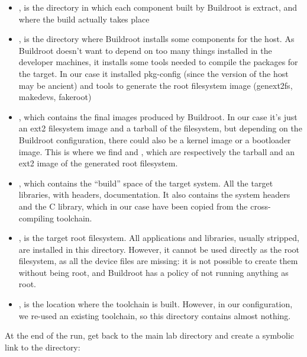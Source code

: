 \begin{itemize}

\item {}, is the directory in which each component built by
  Buildroot is extract, and where the build actually takes place

\item {}, is the directory where Buildroot installs some
  components for the host. As Buildroot doesn't want to depend on too
  many things installed in the developer machines, it installs some
  tools needed to compile the packages for the target. In our case it
  installed pkg-config (since the version of the host may be ancient)
  and tools to generate the root filesystem image (genext2fs,
  makedevs, fakeroot)

\item {}, which contains the final images produced by
  Buildroot. In our case it's just an ext2 filesystem image and a
  tarball of the filesystem, but depending on the Buildroot
  configuration, there could also be a kernel image or a bootloader
  image. This is where we find  and
  , which are respectively the tarball and an ext2
  image of the generated root filesystem.

\item {}, which contains the “build” space of the target
  system. All the target libraries, with headers, documentation. It
  also contains the system headers and the C library, which in our
  case have been copied from the cross-compiling toolchain.

\item {}, is the target root filesystem. All applications
  and libraries, usually stripped, are installed in this
  directory. However, it cannot be used directly as the root
  filesystem, as all the device files are missing: it is not possible
  to create them without being root, and Buildroot has a policy of not
  running anything as root.

\item {}, is the location where the toolchain is
  built. However, in our configuration, we re-used an existing
  toolchain, so this directory contains almost nothing.

\end{itemize}

At the end of the run, get back to the main lab directory and create a
symbolic link to the  directory:

